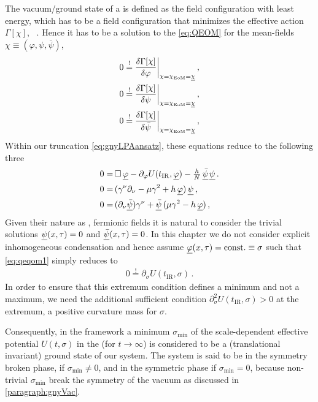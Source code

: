 The vacuum/ground state of a \qft{} is defined as the field configuration with least energy, which has to be a field configuration that minimizes the \ir{} effective action $\Gamma [ \chi ]$, \cf{}\ .
Hence it has to be a solution to the \qeom{} \eqref{eq:QEOM} for the mean-fields $\chi\equiv (\varphi,\psi,\bar{\psi})$,
\begin{subequations}
\begin{align}
	0 \overset{!}{=} \frac{\delta \Gamma [\MFchi]}{\delta \MFphi}\bigg|_{\MFchi=\MFchi_\eom=\MFEchi} \, ,\\
	0 \overset{!}{=} \frac{\delta \Gamma [\MFchi]}{\delta \MFpsi}\bigg|_{\MFchi=\MFchi_\eom=\MFEchi}\, ,\\
	0 \overset{!}{=} \frac{\delta \Gamma [\MFchi]}{\delta \MFpsib}\bigg|_{\MFchi=\MFchi_\eom=\MFEchi} \, ,
\end{align}
\end{subequations}
Within our truncation \eqref{eq:gnyLPAansatz}, these equations reduce to the following three \pdes{}
\begin{subequations}
\begin{align}
	0 = \, & \Box \, \underline{\varphi}  - \partial_\varphi U ( t_\mathrm{IR}, \underline{\varphi} ) - \tfrac{h}{N} \, \underline{\bar{\psi}}\mkern2mu\underline{\psi} \, .\label{eq:qeqom1}\\[.1em]
	0 = \, & ( \gamma^\nu\partial_\nu - \mu \gamma^2 + h \, \underline{\varphi} ) \, \underline{\psi} \, ,	\label{eq:qeqom2}\\[.1em]
	0 = \, & (\partial_\nu \underline{\bar{\psi}}) \gamma^\nu + \underline{\bar{\psi}}\,( \mu \gamma^2 - h \, \underline{\varphi} ) \, ,	\label{eq:qeqom3}
\end{align}
\end{subequations}
Given their nature as \gmv{}, fermionic fields it is natural to consider the trivial solutions $\underline{\psi} (x,\tau) = 0$ and $\underline{\bar{\psi}} (x,\tau) = 0$. 
In this chapter we do not consider explicit inhomogeneous condensation and hence assume $\underline{\varphi} (x,\tau) = \mathrm{const}.\equiv\sigma$ such that \cref{eq:qeqom1} simply reduces to
\begin{align}
	0 \overset{!}{=} \partial_\sigma U ( t_\mathrm{IR}, \sigma ) \, .
\end{align}
In order to ensure that this extremum condition defines a minimum and not a maximum, we need the additional sufficient condition $\partial_\sigma^2 U ( t_\mathrm{IR}, \sigma ) > 0$ at the extremum, \viz{} a positive \ir{} curvature mass for $\sigma$.

Consequently, in the \frg{} framework a minimum $\sigma_\mathrm{min}$ of the scale-dependent effective potential $U ( t, \sigma )$ in the \ir{} (for $t \rightarrow \infty$) is considered to be a (translational invariant) ground state of our system.
The system is said to be in the symmetry broken phase, if $\sigma_\mathrm{min} \neq 0$, and in the symmetric phase if $\sigma_\mathrm{min} = 0$, because non-trivial $\sigma_\mathrm{min}$ break the \ZII{} symmetry of the vacuum as discussed in \cref{paragraph:gnyVac}.

